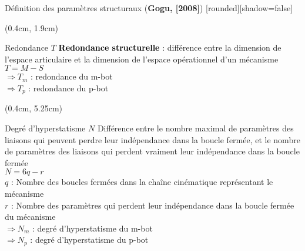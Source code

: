 \documentclass[french]{beamer}
\begin{document}
\begin{frame}{Définition des paramètres structuraux (\textbf{Gogu, [2008]})}
[rounded][shadow=false]
{\scriptsize
\begin{textblock*}{12cm}(0.4cm, 1.9cm)
\begin{block}{Redondance $T$}
\textcolor{black}{\textbf{Redondance structurelle}} : différence entre la dimension de l’espace articulaire et la dimension de  l’espace opérationnel d’un mécanisme\\
\hspace{4.5cm}$T = M - S$\\
\hspace{0.5cm}$\Rightarrow T_m$ : redondance du m-bot\\
\hspace{0.5cm}$\Rightarrow T_p$ : redondance du p-bot
\end{block}
\end{textblock*}

\begin{textblock*}{12cm}(0.4cm, 5.25cm)
\begin{block}{Degré d'hyperstatisme $N$}
Différence entre le nombre maximal de paramètres des liaisons qui peuvent perdre leur indépendance dans la boucle fermée, et le nombre de paramètres des liaisons qui perdent vraiment leur indépendance dans la boucle fermée\\
\hspace{4.5cm}$N = 6q - r$\\
$q$ : Nombre des boucles fermées dans la chaîne cinématique représentant le mécanisme\\
$r$ : Nombre des paramètres qui perdent leur indépendance dans la boucle fermée du mécanisme\\
\hspace{0.5cm}$\Rightarrow N_m$ : degré d'hyperstatisme du m-bot\\
\hspace{0.5cm}$\Rightarrow N_p$ : degré d'hyperstatisme du p-bot
\end{block}
\end{textblock*}
}
\end{frame}


\end{document}
